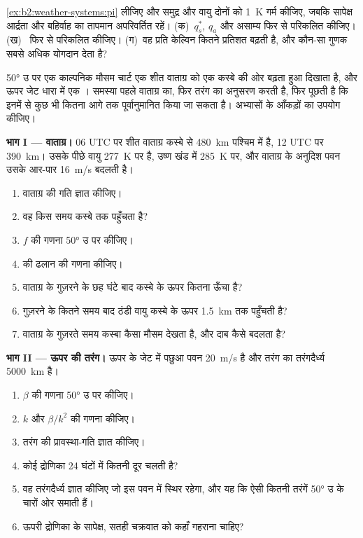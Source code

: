 \begin{exercise}[$\star\star\star$]\label{exo:b2:weather-systems:12}
\cref{ex:b2:weather-systems:pi} लीजिए और समुद्र और वायु दोनों को \qty{1}{K} गर्म कीजिए, जबकि
सापेक्ष आर्द्रता और बहिर्वाह का तापमान अपरिवर्तित रहें। (क)~$q_s^*$, $q_a$ और
असाम्य फिर से परिकलित कीजिए। (ख)~ फिर से परिकलित कीजिए। (ग)~वह प्रति केल्विन कितने प्रतिशत
बढ़ती है, और कौन-सा गुणक सबसे अधिक योगदान देता है?
\end{exercise}

\begin{problem}[{सप्ताहांत समस्या --- कितना आगे?}]\label{pb:b2:weather-systems:1}
\ang{50} उ पर एक काल्पनिक मौसम चार्ट एक शीत वाताग्र को एक कस्बे की ओर बढ़ता हुआ दिखाता है, और ऊपर जेट धारा में
एक । समस्या पहले वाताग्र का, फिर तरंग का अनुसरण करती है, फिर पूछती है कि इनमें से कुछ भी
कितना आगे तक पूर्वानुमानित किया जा सकता है। अभ्यासों के आँकड़ों का उपयोग कीजिए।

\medskip\noindent\textbf{भाग I --- वाताग्र।}
06 UTC पर शीत वाताग्र कस्बे से \qty{480}{km} पश्चिम में है, 12 UTC पर \qty{390}{km}। उसके पीछे
वायु \qty{277}{K} पर है, उष्ण खंड में \qty{285}{K} पर, और वाताग्र के अनुदिश पवन
उसके आर-पार \qty{16}{m/s} बदलती है।
\begin{enumerate}
  \item वाताग्र की गति ज्ञात कीजिए।
  \item वह किस समय कस्बे तक पहुँचता है?
  \item $f$ की गणना \ang{50} उ पर कीजिए।
  \item {} की ढलान की गणना कीजिए।
  \item वाताग्र के गुज़रने के छह घंटे बाद कस्बे के ऊपर  कितना ऊँचा है?
  \item गुज़रने के कितने समय बाद ठंडी वायु कस्बे के ऊपर \qty{1.5}{km} तक पहुँचती है?
  \item वाताग्र के गुज़रते समय कस्बा कैसा मौसम देखता है, और दाब कैसे बदलता है?
\end{enumerate}

\medskip\noindent\textbf{भाग II --- ऊपर की तरंग।}
ऊपर के जेट में पछुआ पवन \qty{20}{m/s} है और तरंग का तरंगदैर्ध्य \qty{5000}{km} है।
\begin{enumerate}[resume]
  \item $\beta$ की गणना \ang{50} उ पर कीजिए।
  \item $k$ और $\beta/k^2$ की गणना कीजिए।
  \item तरंग की प्रावस्था-गति ज्ञात कीजिए।
  \item कोई द्रोणिका 24 घंटों में कितनी दूर चलती है?
  \item वह तरंगदैर्ध्य ज्ञात कीजिए जो इस पवन में स्थिर रहेगा, और यह कि ऐसी कितनी तरंगें
        \ang{50} उ के चारों ओर समाती हैं।
  \item ऊपरी द्रोणिका के सापेक्ष, सतही चक्रवात को कहाँ गहराना चाहिए?
\end{enumerate}


\end{problem}

